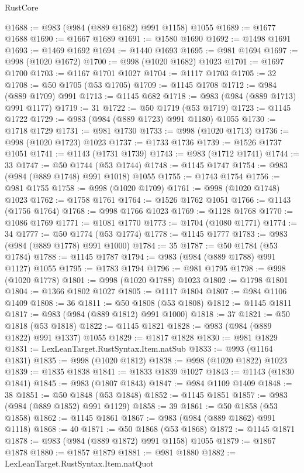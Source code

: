 \begin{lexlean}{RustCore}
\begin{coremodule}
@1688 := @983 (@984 (@889 @1682) @991 @1158) @1055
@1689 := @1677 @1688
@1690 := @1667 @1689
@1691 := @1580 @1690
@1692 := @1498 @1691
@1693 := @1469 @1692
@1694 := @1440 @1693
@1695 := @981 @1694
@1697 := @998 (@1020 @1672)
@1700 := @998 (@1020 @1682) @1023
@1701 := @1697 @1700
@1703 := @1167 @1701 @1027
@1704 := @1117 @1703
@1705 := 32
@1708 := @50 @1705 (@53 @1705)
@1709 := @1145 @1708
@1712 := @984 (@889 @1709) @991
@1713 := @1145 @682
@1718 := @983 (@984 (@889 @1713) @991 @1177)
@1719 := 31
@1722 := @50 @1719 (@53 @1719)
@1723 := @1145 @1722
@1729 := @983 (@984 (@889 @1723) @991 @1180) @1055
@1730 := @1718 @1729
@1731 := @981 @1730
@1733 := @998 (@1020 @1713)
@1736 := @998 (@1020 @1723) @1023
@1737 := @1733 @1736
@1739 := @1526 @1737 @1051
@1741 := @1143 (@1731 @1739)
@1743 := @983 (@1712 @1741)
@1744 := 33
@1747 := @50 @1744 (@53 @1744)
@1748 := @1145 @1747
@1754 := @983 (@984 (@889 @1748) @991 @1018) @1055
@1755 := @1743 @1754
@1756 := @981 @1755
@1758 := @998 (@1020 @1709)
@1761 := @998 (@1020 @1748) @1023
@1762 := @1758 @1761
@1764 := @1526 @1762 @1051
@1766 := @1143 (@1756 @1764)
@1768 := @998 @1766 @1023
@1769 := @1128 @1768
@1770 := @1086 @1769
@1771 := @1081 @1770
@1773 := @1704 (@1080 @1771)
@1774 := 34
@1777 := @50 @1774 (@53 @1774)
@1778 := @1145 @1777
@1783 := @983 (@984 (@889 @1778) @991 @1000)
@1784 := 35
@1787 := @50 @1784 (@53 @1784)
@1788 := @1145 @1787
@1794 := @983 (@984 (@889 @1788) @991 @1127) @1055
@1795 := @1783 @1794
@1796 := @981 @1795
@1798 := @998 (@1020 @1778)
@1801 := @998 (@1020 @1788) @1023
@1802 := @1798 @1801
@1804 := @1366 @1802 @1027
@1805 := @1117 @1804
@1807 := @984 @1106 @1409
@1808 := 36
@1811 := @50 @1808 (@53 @1808)
@1812 := @1145 @1811
@1817 := @983 (@984 (@889 @1812) @991 @1000)
@1818 := 37
@1821 := @50 @1818 (@53 @1818)
@1822 := @1145 @1821
@1828 := @983 (@984 (@889 @1822) @991 @1337) @1055
@1829 := @1817 @1828
@1830 := @981 @1829
@1831 := LexLeanTarget.RustSyntax.Item.natSub
@1833 := @993 (@1164 @1831)
@1835 := @998 (@1020 @1812)
@1838 := @998 (@1020 @1822) @1023
@1839 := @1835 @1838
@1841 := @1833 @1839 @1027
@1843 := @1143 (@1830 @1841)
@1845 := @983 (@1807 @1843)
@1847 := @984 @1109 @1409
@1848 := 38
@1851 := @50 @1848 (@53 @1848)
@1852 := @1145 @1851
@1857 := @983 (@984 (@889 @1852) @991 @1129)
@1858 := 39
@1861 := @50 @1858 (@53 @1858)
@1862 := @1145 @1861
@1867 := @983 (@984 (@889 @1862) @991 @1118)
@1868 := 40
@1871 := @50 @1868 (@53 @1868)
@1872 := @1145 @1871
@1878 := @983 (@984 (@889 @1872) @991 @1158) @1055
@1879 := @1867 @1878
@1880 := @1857 @1879
@1881 := @981 @1880
@1882 := LexLeanTarget.RustSyntax.Item.natQuot

\end{coremodule}
\end{lexlean}

